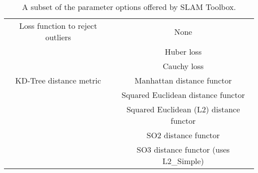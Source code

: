 \begin{table}
{\begin{tabular}{|c|c|}
         Loss function to reject outliers                           & None                                                  \\
                                                                    & Huber loss                                            \\
                                                                    & Cauchy loss                                           \\ \hline
        KD-Tree distance metric                                     & Manhattan distance functor                            \\ 
                                                                    & Squared Euclidean distance functor                    \\
                                                                    & Squared Euclidean (L2) distance functor               \\
                                                                    & SO2 distance functor                                  \\
                                                                    & SO3 distance functor (uses L2\_Simple)                \\ \hline
    \end{tabular}}
    \caption{A subset of the parameter options offered by SLAM Toolbox\:\cite{macenski_slam_2021}\cite{macenski_use_2019}.}
    \label{tab:slam_toolbox_params}
\end{table}



\begin{comment}
\end{comment}

